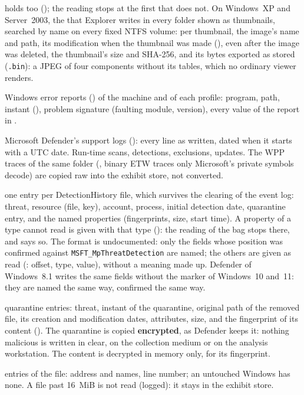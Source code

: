 \documentclass[11pt,a4paper,oneside]{report}
\begin{document}
\begin{description}[style=nextline,leftmargin=1.2em]
        holds too (); the
        reading stops at the first that does not. On Windows~XP and Server~2003, the
         that Explorer writes in every folder shown as
        thumbnails, searched by name on every fixed NTFS volume: per
        thumbnail, the image's name and path, its modification when the
        thumbnail was made (), even after the image
        was deleted, the thumbnail's size and SHA-256, and its bytes exported
        as stored (\texttt{.bin}): a JPEG of four components without its
        tables, which no ordinary viewer renders.
  \item[\fichier{error\_reports.json}] Windows error reports
        () of the machine and of each profile: program, path,
        instant (), problem signature (faulting module,
        version), every value of the report in .
  \item[\fichier{defender\_log.json}] Microsoft Defender's support logs
        (): every line as written, dated when it starts with
        a UTC date. Run-time scans, detections, exclusions, updates. The WPP
        traces of the same folder (, binary ETW traces only
        Microsoft's private symbols decode) are copied raw into the exhibit
        store, not converted.
  \item[\fichier{defender\_detections.json}] one entry per DetectionHistory
        file, which survives the clearing of the event log: threat, resource
        (file, key), account, process, initial detection date, quarantine
        entry, and the named  properties (fingerprints,
        size, start time). A property of a type \wac{} cannot read is given
        with that type (): the reading of the bag stops
        there, and says so. The format is undocumented: only the fields whose
        position was confirmed against \texttt{MSFT\_MpThreatDetection} are
        named; the others are given as read (: offset,
        type, value), without a meaning made up. Defender of Windows~8.1
        writes the same fields without the  marker of
        Windows~10 and~11: they are named the same way, confirmed the same
        way.
  \item[\fichier{defender\_quarantine.json}] quarantine entries: threat,
        instant of the quarantine, original path of the removed file, its
        creation and modification dates, attributes, size, and the
        fingerprint of its content (). The quarantine is
        copied \textbf{encrypted}, as Defender keeps it: nothing malicious is
        written in clear, on the collection medium or on the analysis
        workstation. The content is decrypted in memory only, for its
        fingerprint.
  \item[\fichier{hosts.json}] entries of the  file: address and
        names, line number; an untouched Windows has none. A file past 16~MiB is
        not read (logged): it stays in the exhibit store.
\end{description}
\end{document}
